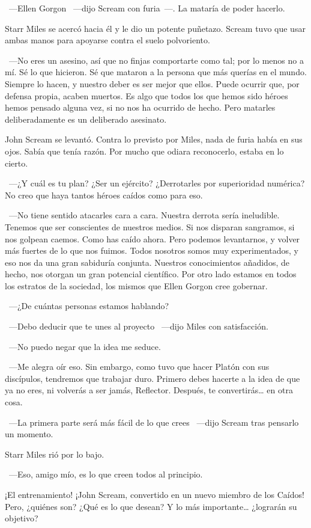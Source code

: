~---Ellen Gorgon ~---dijo Scream con furia~---. La mataría de poder hacerlo.

Starr Miles se acercó hacia él y le dio un potente puñetazo. Scream tuvo que usar ambas manos para apoyarse contra el suelo polvoriento.

~---No eres un asesino, así que no finjas comportarte como tal; por lo menos no a mí. Sé lo que hicieron. Sé que mataron a la persona que más querías en el mundo. Siempre lo hacen, y nuestro deber es ser mejor que ellos. Puede ocurrir que, por defensa propia, acaben muertos. Es algo que todos los que hemos sido héroes hemos pensado alguna vez, si no nos ha ocurrido de hecho. Pero matarles deliberadamente es un deliberado asesinato.

John Scream se levantó. Contra lo previsto por Miles, nada de furia había en sus ojos. Sabía que tenía razón. Por mucho que odiara reconocerlo, estaba en lo cierto.

~---¿Y cuál es tu plan? ¿Ser un ejército? ¿Derrotarles por superioridad numérica? No creo que haya tantos héroes caídos como para eso.

~---No tiene sentido atacarles cara a cara. Nuestra derrota sería ineludible. Tenemos que ser conscientes de nuestros medios. Si nos disparan sangramos, si nos golpean caemos. Como has caído ahora. Pero podemos levantarnos, y volver más fuertes de lo que nos fuimos. Todos nosotros somos muy experimentados, y eso nos da una gran sabiduría conjunta. Nuestros conocimientos añadidos, de hecho, nos otorgan un gran potencial científico. Por otro lado estamos en todos los estratos de la sociedad, los mismos que Ellen Gorgon cree gobernar.

~---¿De cuántas personas estamos hablando?

~---Debo deducir que te unes al proyecto ~---dijo Miles con satisfacción.

~---No puedo negar que la idea me seduce.

~---Me alegra oír eso. Sin embargo, como tuvo que hacer Platón con sus discípulos, tendremos que trabajar duro. Primero debes hacerte a la idea de que ya no eres, ni volverás a ser jamás, Reflector. Después, te convertirás\dots{} en otra cosa.

~---La primera parte será más fácil de lo que crees ~---dijo Scream tras pensarlo un momento.

Starr Miles rió por lo bajo.

~---Eso, amigo mío, es lo que creen todos al principio.

\begin{next}
    ¡El entrenamiento! ¡John Scream, convertido en un nuevo miembro de los Caídos! Pero, ¿quiénes son? ¿Qué es lo que desean? Y lo más importante\dots{} ¿lograrán su objetivo?
\end{next}

\endinput
